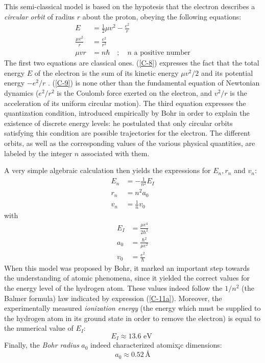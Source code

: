 This semi-classical model is based on the hypotesis that the electron describes a \textit{circular orbit} of radius $r$ about the proton, obeying the following equations:
\begin{align}
	\label{C-8}E&=\frac{1}{2}\mu v^2-\frac{e^2}{r}\\
	\label{C-9}\frac{\mu v^2}{r}&=\frac{e^2}{r^2}\\
	\mu  v r&=n\hbar\quad ; \quad \mbox{$n$ a positive number}\label{C-10}
\end{align}
The first two equations are classical ones. (\ref{C-8}) expresses the fact that the total energy $E$ of the electron is the sum of its kinetic energy $\mu v^2/2$  and its potential energy $-e^2/r$ . (\ref{C-9}) is none other than the fundamental equation of Newtonian dynamics ($e^2/r^2$ is the Coulomb force exerted on the electron, and $v^2/r$ is the acceleration of its uniform circular motion). The third equation expresses the quantization condition, introduced empirically by Bohr in order to explain the existence of discrete energy levels: he postulated that only circular orbits satisfying this condition are possible trajectories for the electron. The different orbits, as well as the corresponding values of the various physical quantities, are labeled by the integer $n$ associated with them.

A very simple algebraic calculation then yields the expressions for $E_n,r_n$ and $v_n$:
\begin{align}
	\label{C-11a}E_n&=-\frac{1}{n^2}E_I\\
	\label{C-11b}r_n&=n^2a_0\\
	v_n&=\frac{1}{n}v_0\label{C-11c}
\end{align}
with 
\begin{align}
	\label{C-12a}E_I&=\frac{\mu e^4}{2\hbar^2}\\
	\label{C-12b}a_0&=\frac{\hbar^2}{\mu e^2}\\
	v_0&=\frac{e^2}{\hbar}\label{C-12c}
\end{align}
When this model was proposed by Bohr, it marked an important step towards the understanding of atomic phenomena, since it yielded the correct values for the energy level of the hydrogen atom. These values indeed follow the $1/n^2$ (the Balmer formula) law indicated by expression (\ref{C-11a}). Moreover, the experimentally measured \textit{ionization energy} (the energy which must be supplied to the hydrogen atom in its ground state in order to remove the electron) is equal to the numerical value of $E_I$:
\begin{equation}\label{C-13}
	E_I\approx 13.6 \mbox{ eV }
\end{equation}
Finally, the \textit{Bohr radius} $a_0$ indeed characterized atomix¡c dimensions:
\begin{equation}\label{C-14}
	a_0\approx 0.52  \,\si{\angstrom}
\end{equation}

